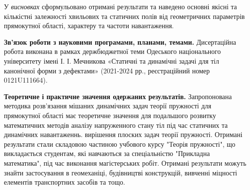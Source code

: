 У \textit{висновках}
сформульовано отримані результати та наведено основні якісні та кількістні залежності хвильових та статичних полів
від геометричних параметрів прямокутної області, характеру та частоти навантаження.

\textbf{Зв’язок роботи з науковими програмами, планами, темами.}
Дисертаційна робота виконана в рамках держбюджетної теми Одеського національного університету імені І. І. Мечникова
«Статичні та динамічні задачі для тіл канонічної форми з дефектами»
(2021-2024 рр., реєстраційний номер 0121U111664).

\textbf{Теоретичне і практичне значення одержаних результатів.} 
Запропонована методика розв'язання мішаних динамічних задач теорії пружності для прямокутної області має теоретичне значення для подальшого розвитку математичних методів аналізу напруженного стану тіл під час статичних та динамічних навантаженнь. вирішення плоских задач теорії пружності.
Отримані результати стали складовою частиною учбового курсу "Теорія пружності", що викладається студентам, які навчаються за спеціальністю "Прикладна математика", під час виконання магістерських робіт.
Отримані результати можуть знайти застосування в геомеханіці, будівництві конструкцій, вивченні міцності елементів транспортних засобів та тощо.
